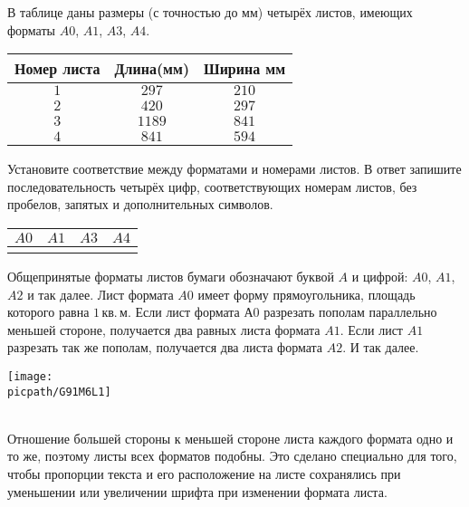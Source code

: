 %
%

\begin{class}[number=1]
	\begin{listofex}
		\item В таблице даны размеры (с точностью до мм) четырёх листов, имеющих форматы \( A0 \), \( A1 \), \( A3 \), \( A4 \).
		\begin{center}
			\footnotesize
			\begin{tabular}{|c|c|c|}
				\hline
				\rowcolor{gray}\textbf{Номер листа}&\textbf{Длина(мм)}&\textbf{Ширина мм}\\
				\hline
				\( 1 \)&\( 297 \)&\( 210 \)\\
				\hline
				\( 2 \)&\( 420 \)&\( 297 \)\\
				\hline
				\( 3 \)&\( 1189 \)&\( 841 \)\\
				\hline
				\( 4 \)&\( 841 \)&\( 594 \)\\
				\hline
			\end{tabular}
		\end{center}
		Установите соответствие между форматами и номерами листов. В ответ запишите последовательность четырёх цифр, соответствующих номерам листов, без пробелов, запятых и дополнительных символов.
		\begin{center}
			\footnotesize
			\begin{tabular}{|c|c|c|c|}
				\hline
				\textbf{\( A0 \)}&\textbf{\( A1 \)}&\textbf{\( A3 \)}&\textbf{\( A4 \)}\\
				\hline
				\(  \)&\(  \)&\(  \)&\(  \)\\
				\hline
			\end{tabular}
		\end{center}
		Общепринятые форматы листов бумаги обозначают буквой \( A \) и цифрой: \( A0 \), \( A1 \), \( A2 \) и так далее. Лист формата \( A0 \) имеет форму прямоугольника, площадь которого равна \( 1 \) кв. м. Если лист формата А0 разрезать пополам параллельно меньшей стороне, получается два равных листа формата \( A1 \). Если лист \( A1 \) разрезать так же пополам, получается два листа формата \( A2 \). И так далее.\\
		\begin{minipage}[c]{0.35\textwidth}
			\texttt{[image: \\picpath/G91M6L1]}
		\end{minipage}\\
		Отношение большей стороны к меньшей стороне листа каждого формата одно и то же, поэтому листы всех форматов подобны. Это сделано специально для того, чтобы пропорции текста и его расположение на листе сохранялись при уменьшении или увеличении шрифта при изменении формата листа.

\end{listofex}
\end{class}
